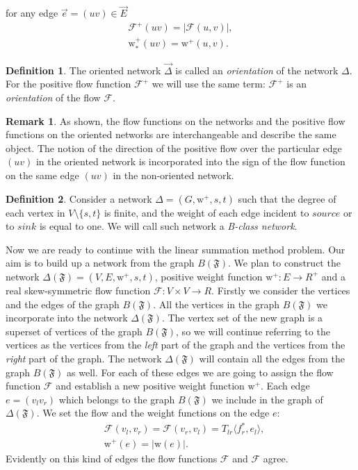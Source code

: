 \documentclass[12pt]{article}
\newcommand\inner[2]{\langle #1, #2 \rangle}
\theoremstyle{definition}
\newtheorem{remark}{Remark}
\newtheorem{definition}{Definition}
\newcommand{\fsys}{\mathfrak{F}}
\newcommand{\wt}{\mathrm{w}}
\newcommand{\wtp}{\mathrm{w}^{+}}
\newcommand{\flow}{\mathcal{F}}
\newcommand{\flowpos}{\mathcal{F}^{+}}
\newcommand{\flowsgn}{\flow}
\newcommand{\source}{\mathit{source}}
\newcommand{\sink}{\mathit{sink}}
\newcommand{\net}{\Delta}
\newcommand{\onet}{\vec{\Delta}}
\numberwithin{remark}{section}
\numberwithin{theorem}{section}
\numberwithin{prop}{section}
\numberwithin{equation}{section}
\numberwithin{lemma}{section}
\numberwithin{prop_under_lemma}{lemma}
\begin{document}
    for any edge $\vec{e} = (uv) \in \vec{E}$
    \begin{align*}
      \flowpos(uv) = |\flow(u,v)|,\\
      \wtp_{*}(uv) = \wtp(u,v).
    \end{align*}
    \begin{definition}
      The oriented network $\onet$ is called an \emph{orientation} of the network $\net$.
      For the positive flow function $\flowpos$ we will use the same term:
        $\flowpos$ is an \emph{orientation} of the flow $\flow$.
    \end{definition}
    \begin{remark}
      As shown, the flow functions on the networks and the positive flow functions on the oriented networks
        are interchangeable and describe the same object.
      The notion of the direction of the positive flow over the particular edge $(uv)$ in the oriented network
        is incorporated into the sign of the flow function on the same edge $(uv)$ in the non-oriented network.
    \end{remark}
    \begin{definition}
      Consider a network $\net = (G, \wtp, s, t)$ such that
        the degree of each vertex in $V \setminus \{s, t\} $ is finite,
        and the weight of each edge incident to $\source$ or to $\sink$ is equal to one.
      We will call such network a \emph{B-class network}.
    \end{definition}
    
    Now we are ready to continue with the linear summation method problem.
    Our aim is to build up a network from the graph $B(\fsys)$.
    We plan to construct the network $\net(\fsys) = (V, E, \wtp, s, t)$,
    positive weight function $\wtp: E \to R^{+}$ and a real skew-symmetric flow function $\flow: V \times V \to R$.
    Firstly we consider the vertices and the edges of the graph $B(\fsys)$.
    All the vertices in the graph $B(\fsys)$ we incorporate into the network $\net(\fsys)$.
    The vertex set of the new graph is a superset of vertices of the graph $B(\fsys)$,
    so we will continue referring to the vertices as the vertices from 
    the \textit{left} part of the graph and the vertices from the \textit{right} part of the graph.
    The network $\net(\fsys)$ will contain all the edges from the graph $B(\fsys)$ as well.
    For each of these edges we are going to assign the flow function $\flow$ and
    establish a new positive weight function $\wtp$.
    Each edge $e = (v_l v_r)$ which belongs to the graph $B(\fsys)$ we include in the graph of $\net(\fsys)$.
    We set the flow and the weight functions on the edge $e$:
    \begin{align*}
      &\flow(v_l, v_r) = \flowsgn(v_r, v_l) = T_{lr} \inner{f^*_r}{e_l},\\
      &\wtp(e) = \left| \wt(e) \right|.
    \end{align*}
    Evidently on this kind of edges the flow functions $\flowsgn$ and $\flow$ agree.
    
\end{document}
